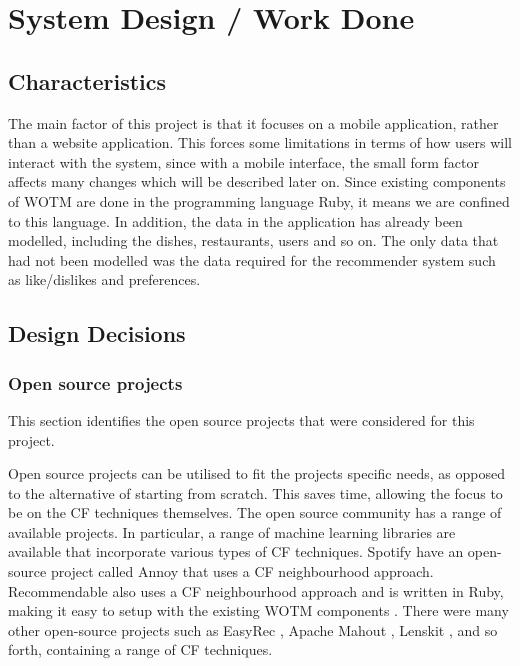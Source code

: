 \chapter{System Design / Work Done}\label{C:work_done}

\section{Characteristics}

The main factor of this project is that it focuses on a mobile application, rather than a website application. This forces some limitations in terms of how users will interact with the system, since with a mobile interface, the small form factor affects many changes which will be described later on. Since existing components of WOTM are done in the programming language Ruby, it means we are confined to this language. In addition, the data in the application has already been modelled, including the dishes, restaurants, users and so on. The only data that had not been modelled was the data required for the recommender system such as like/dislikes and preferences.   

\section{Design Decisions}

\subsection{Open source projects}
This section identifies the open source projects that were considered for this project.

Open source projects can be utilised to fit the projects specific needs, as opposed to the alternative of starting from scratch. This saves time, allowing the focus to be on the CF techniques themselves. The open source community has a range of available projects. In particular, a range of machine learning libraries are available that incorporate various types of CF techniques. Spotify \cite{annoy} have an open-source project called Annoy \cite{annoy} that uses a CF neighbourhood approach. Recommendable \cite{recommendable} also uses a CF neighbourhood approach and is written in Ruby, making it easy to setup with the existing WOTM components \cite{recommendable}. There were many other open-source projects such as EasyRec \cite{easyrec}, Apache Mahout \cite{mahoutaction}, Lenskit \cite{lenskit}, and so forth, containing a range of CF techniques. 

